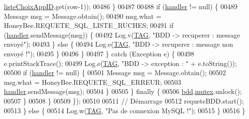 \begin{DoxyCode}
      \hyperlink{classfr_1_1campus_1_1laurainc_1_1honeybee_1_1_ruche_a839228c6a5015c4c3db018316e4e776f}{listeChoixAppID}.get(row-1));
00486                         \}
00487 
00488                         \textcolor{keywordflow}{if} (\hyperlink{classfr_1_1campus_1_1laurainc_1_1honeybee_1_1_ruche_a9689ca454694434549e5fffca876ffae}{handler} != null) \{
00489                             Message msg = Message.obtain();
00490                             msg.what = HoneyBee.REQUETE\_SQL\_LISTE\_RUCHES;
00491                             \textcolor{keywordflow}{if} (\hyperlink{classfr_1_1campus_1_1laurainc_1_1honeybee_1_1_ruche_a9689ca454694434549e5fffca876ffae}{handler}.sendMessage(msg)) \{
00492                                 Log.v(\hyperlink{classfr_1_1campus_1_1laurainc_1_1honeybee_1_1_ruche_a44739cbb0fa7451c1edc240a3f51c257}{TAG}, \textcolor{stringliteral}{"BDD -> recuperer : message envoyé"});
00493                             \} \textcolor{keywordflow}{else} \{
00494                                 Log.e(\hyperlink{classfr_1_1campus_1_1laurainc_1_1honeybee_1_1_ruche_a44739cbb0fa7451c1edc240a3f51c257}{TAG}, \textcolor{stringliteral}{"BDD -> recuperer : message non envoyé !"});
00495                             \}
00496                         \}
00497                     \} \textcolor{keywordflow}{catch} (Exception e) \{
00498                         e.printStackTrace();
00499                         Log.e(\hyperlink{classfr_1_1campus_1_1laurainc_1_1honeybee_1_1_ruche_a44739cbb0fa7451c1edc240a3f51c257}{TAG}, \textcolor{stringliteral}{"BDD -> exception : "} + e.toString());
00500                         \textcolor{keywordflow}{if} (\hyperlink{classfr_1_1campus_1_1laurainc_1_1honeybee_1_1_ruche_a9689ca454694434549e5fffca876ffae}{handler} != null) \{
00501                             Message msg = Message.obtain();
00502                             msg.what = HoneyBee.REQUETE\_SQL\_ERREUR;
00503                             \hyperlink{classfr_1_1campus_1_1laurainc_1_1honeybee_1_1_ruche_a9689ca454694434549e5fffca876ffae}{handler}.sendMessage(msg);
00504                         \}
00505                     \} \textcolor{keywordflow}{finally} \{
00506                         \hyperlink{classfr_1_1campus_1_1laurainc_1_1honeybee_1_1_ruche_a0eb43a2b63fb83e9d5af6cd6b754c7da}{bdd}.\hyperlink{classfr_1_1campus_1_1laurainc_1_1honeybee_1_1_base_de_donnees_a0dd6f285a11459c086adea6080bed282}{mutex}.unlock();
00507                     \}
00508                 \}
00509             \});
00510 
00511             \textcolor{comment}{// Démarrage}
00512             requeteBDD.start();
00513         \} \textcolor{keywordflow}{else} \{
00514             Log.w(\hyperlink{classfr_1_1campus_1_1laurainc_1_1honeybee_1_1_ruche_a44739cbb0fa7451c1edc240a3f51c257}{TAG}, \textcolor{stringliteral}{"Pas de connexion MySQL !"});
00515         \}
00516     \}
\end{DoxyCode}
